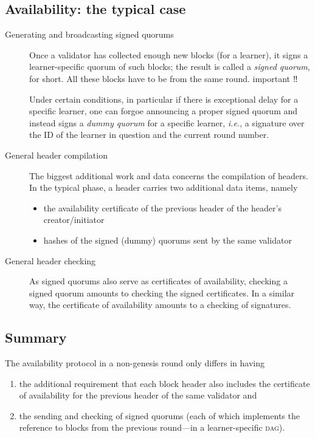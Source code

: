 \documentclass{article}
\theoremstyle{definition}
\newcommand{\tnote}[1]{
  \marginnote{\footnotesize #1}%
}
\newcommand{\Dag}[1][]{\textsc{dag}#1\xspace}
\newcommand{\ie}[1][]{\emph{i.e.}, }
\begin{document}
\subsection{Availability: the typical case}

\begin{description}
\item[Generating and broadcasting signed quorums]
  \tnote{primary \\⇒ primary}
  Once a validator has collected 
  enough new  blocks (for a learner), 
  it signs a learner-specific quorum of such blocks;
  the result is called a \emph{signed quorum},  
  for short. 
  All these blocks have to be from the same round. {\color{red} important ‼}

  Under certain conditions,
  in particular if there is exceptional delay for a specific learner,
  one can forgoe announcing a proper signed quorum
  and instead signs a \emph{dummy quorum} for a specific learner,
  \ie a signature over the ID of the learner in question and the current round number.  

\item[General header compilation]
  The biggest additional work and data
  concerns the compilation of headers.
  In the typical phase, 
  a header carries two additional data items, namely
  \begin{itemize}
  \item 
    the availability certificate of the previous header 
    of the header's creator/initiator
  \item 
    hashes of the signed (dummy) quorums sent by the same validator
  \end{itemize}

\item[General header checking]
  As signed quorums also serve as certificates of availability,
  checking a signed quorum amounts to checking the signed certificates.
  In a similar way,
  the certificate of availability amounts to a checking of signatures.
\end{description}


\subsection{Summary}
The availability protocol in a non-genesis round 
only differs in having
\begin{enumerate}
\item the additional requirement 
that each block header also includes 
the certificate of availability 
for the previous header of the same validator and 
\item 
the sending and checking of signed quorums
(each of which implements the reference to 
blocks from the previous round—in a learner-specific \Dag).
\end{enumerate}
\end{document}
